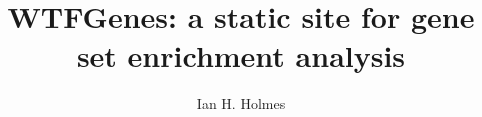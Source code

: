 \documentclass{article}
\begin{document}
\newcommand\structabs[5]{\maketitle \abstract{#1 #2 #3 Contact: #4}}

\title{WTFGenes: a static site for gene set enrichment analysis}
\author{Ian H. Holmes}


\end{document}

